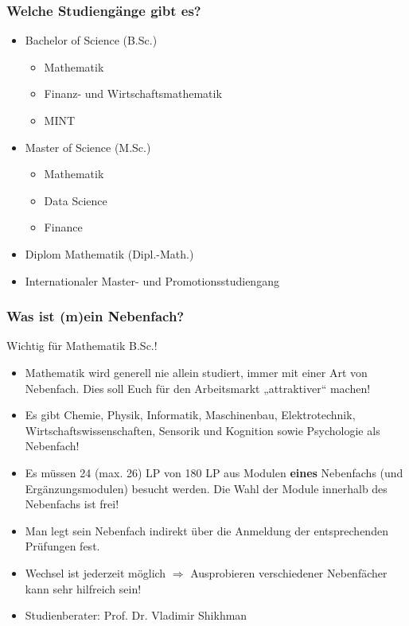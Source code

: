 \documentclass[10pt]{beamer}
\makeatletter
\newcommand{\highl}[1]{\color{tuccolor@ma}#1\color{black}}
\makeatother
\begin{document}
\begin{frame}
	\frametitle{Welche Studiengänge gibt es?}
	\begin{itemize}
		\item Bachelor of Science (B.Sc.)
			\begin{itemize}
				\item Mathematik
				\item Finanz- und Wirtschafts­mathematik
				\item MINT
			\end{itemize}
		\item Master of Science (M.Sc.)
			\begin{itemize}
				\item Mathematik
				\item Data Science
				\item Finance
			\end{itemize}
		\item Diplom Mathematik (Dipl.-Math.)
		\item Internationaler Master- und Promotions­studiengang
	\end{itemize}
\end{frame}

\begin{frame}
	\frametitle{Was ist (m)ein Nebenfach?}
	\highl{Wichtig für Mathematik B.Sc.!}
	\begin{itemize}
		\item Mathematik wird generell nie allein studiert, immer mit einer Art von Nebenfach. Dies soll Euch für den Arbeitsmarkt „attraktiver“ machen!
		\item Es gibt Chemie, Physik, Informatik, Maschinenbau, Elektrotechnik, Wirtschaftswissenschaften, Sensorik und Kognition sowie Psychologie als Nebenfach!
		\item Es müssen 24 (max. 26) LP von 180 LP aus Modulen \textbf{eines} Nebenfachs (und Ergänzungsmodulen) besucht werden. Die Wahl der Module innerhalb des Nebenfachs ist frei!
		\item Man legt sein Nebenfach indirekt über die Anmeldung der entsprechenden Prüfungen fest.
		\item Wechsel ist jederzeit möglich $\Rightarrow$ Ausprobieren verschiedener Nebenfächer kann sehr hilfreich sein!
		\item Studienberater: Prof. Dr. Vladimir Shikhman
	\end{itemize}
\end{frame}
\end{document}

